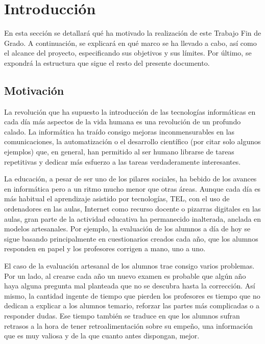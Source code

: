 \chapter{Introducción \label{sec:introduccion}}

En esta sección se detallará qué ha motivado la realización de este Trabajo Fin de Grado. A continuación, se explicará en qué marco se ha llevado a cabo, así como el alcance del proyecto, especificando sus objetivos y sus límites. Por último, se expondrá  la estructura que sigue el resto del presente documento.

\section{Motivación}


La revolución que ha supuesto la introducción de las tecnologías informáticas en cada día más aspectos de la vida humana es una revolución de un profundo calado. La informática ha traído consigo mejoras inconmensurables en las comunicaciones, la automatización o el desarrollo científico (por citar solo algunos ejemplos) que, en general, han permitido al ser humano librarse de tareas repetitivas y dedicar más esfuerzo a las tareas verdaderamente interesantes.

La educación, a pesar de ser uno de los pilares sociales, ha bebido de los avances en informática pero a un ritmo mucho menor que otras áreas. Aunque cada día es más habitual el aprendizaje asistido por tecnologías, \acrshort{TEL}, con el uso de ordenadores en las aulas, Internet como recurso docente o pizarras digitales en las aulas, gran parte de la actividad educativa ha permanecido inalterada, anclada en modelos artesanales. Por ejemplo, la evaluación de los alumnos a día de hoy se sigue basando principalmente en cuestionarios creados cada año, que los alumnos responden en papel y los profesores corrigen a mano, uno a uno.

El caso de la evaluación artesanal de los alumnos trae consigo varios problemas. Por un lado, al crearse cada año un nuevo examen es probable que algún año haya alguna pregunta mal planteada que no se descubra hasta la corrección. Así mismo, la cantidad ingente de tiempo que pierden los profesores es tiempo que no dedican a explicar a los alumnos temario, reforzar las partes más complicadas o a responder dudas. Ese tiempo también se traduce en que los alumnos sufran retrasos a la hora de tener retroalimentación sobre su empeño, una información que es muy valiosa y de la que cuanto antes dispongan, mejor.

